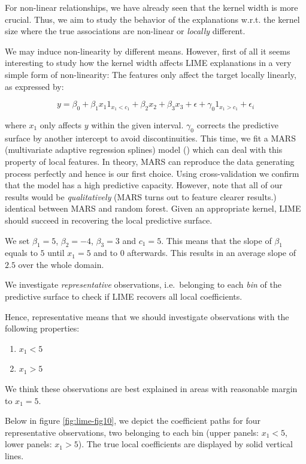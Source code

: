 \documentclass[]{krantz}
\begin{document}
For non-linear relationships, we have already seen that the kernel width
is more crucial. Thus, we aim to study the behavior of the explanations
w.r.t. the kernel size where the true associations are non-linear or
\emph{locally} different.

We may induce non-linearity by different means. However, first of all it
seems interesting to study how the kernel width affects LIME
explanations in a very simple form of non-linearity: The features only
affect the target locally linearly, as expressed by:

\[ y = \beta_0 + \beta_1 x_1 1_{x_1<c_1} + \beta_2 x_2 + \beta_3 x_3 + \epsilon + \gamma_0 1_{x_1>c_1} + \epsilon_i\]

where \(x_1\) only affects \(y\) within the given interval. \(\gamma_0\)
corrects the predictive surface by another intercept to avoid
discontinuities. This time, we fit a MARS (multivariate adaptive
regression splines) model (\citet{friedman1991multivariate}) which can
deal with this property of local features. In theory, MARS can reproduce
the data generating process perfectly and hence is our first choice.
Using cross-validation we confirm that the model has a high predictive
capacity. However, note that all of our results would be
\emph{qualitatively} (MARS turns out to feature clearer results.)
identical between MARS and random forest. Given an appropriate kernel,
LIME should succeed in recovering the local predictive surface.

We set \(\beta_1 = 5\), \(\beta_2 = -4\), \(\beta_3 = 3\) and
\(c_1 = 5\). This means that the slope of \(\beta_1\) equals to \(5\)
until \(x_1 = 5\) and to \(0\) afterwards. This results in an average
slope of \(2.5\) over the whole domain.

We investigate \emph{representative} observations, i.e.~belonging to
each \emph{bin} of the predictive surface to check if LIME recovers all
local coefficients.

Hence, representative means that we should investigate observations with
the following properties:

\begin{enumerate}
\def\labelenumi{\arabic{enumi}.}
\item
  \(x_1 < 5\)
\item
  \(x_1 > 5\)
\end{enumerate}

We think these observations are best explained in areas with reasonable
margin to \(x_1 = 5\).

Below in figure \ref{fig:lime-fig10}, we depict the coefficient paths
for four representative observations, two belonging to each bin (upper
panels: \(x_1 < 5\), lower panels: \(x_1 > 5\)). The true local
coefficients are displayed by solid vertical lines.
\end{document}
